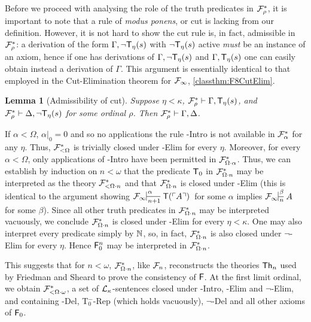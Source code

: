 \documentclass[UKenglish,cleveref,DIV=12]{scrartcl}
\newtheorem{lemma}{Lemma}
\theoremstyle{definition}
\theoremstyle{definition}
\begin{document}
Before we proceed with analysing the role of the truth predicates in
$\mathcal{F}^*_\rho$, it is important to note that a rule of {\em modus ponens}, or cut
is lacking from our definition. However, it is not hard to show the cut rule is,
in fact, admissible in $\mathcal{F}^*_\rho$: a derivation of
the form $\Gamma,\lnot \mathsf{T}_\eta(s)$ with $\lnot\mathsf{T}_\eta(s)$ active {\em must} be an
instance of an axiom, hence if one has derivations of $\Gamma,\lnot \mathsf{T}_\eta(s)$
and $\Gamma,\mathsf{T}_\eta(s)$ one can easily obtain instead a derivation of $\Gamma$.
This argument is essentially identical to that employed in the Cut-Elimination
theorem for $\mathcal{F}_\infty$, \cref{classthm:F8CutElim}.
\begin{lemma}[Admissibility of cut]\label{extthm:FFCutElim}
 Suppose $\eta<\kappa$, $\mathcal{F}^*_\rho\vdash\Gamma,\mathsf{T}_\eta(s)$, and $\mathcal{F}^*_\rho\vdash\Delta,\lnot
  \mathsf{T}_\eta(s)$ for some ordinal $\rho$. Then $\mathcal{F}^*_\rho\vdash\Gamma,\Delta$.
\end{lemma}

If $\alpha<\Omega$, $\alpha|_0=0$ and so no applications the rule \textT\eta-Intro is not available in $\mathcal{F}^*_\alpha$ for any $\eta$. Thus, $\mathcal{F}^*_{\mathord<\Omega}$ is trivially closed under \textT\eta-Elim for every $\eta$. Moreover, for every
$\alpha<\Omega$, only applications of -Intro have been permitted in $\mathcal{F}^*_{\Omega\cdot\alpha}$. Thus, we can
establish by induction on $n<\omega$ that the predicate $\mathsf{T}_0$ in $\mathcal{F}^*_{\Omega\cdot n}$ may be interpreted as the
theory $\mathcal{F}^*_{<\Omega\cdot n}$ and that $\mathcal{F}^*_{\Omega\cdot n}$ is closed under -Elim (this is identical to the argument showing $\Finfty\prov\alpha {n+1}{\T(\gn A)}$ for some $\alpha$ implies $\Finfty\prov\beta n A$ for some $\beta$). Since all other truth
predicates in $\mathcal{F}^*_{\Omega\cdot n}$ may be interpreted vacuously, we conclude $\mathcal{F}^*_{\Omega\cdot n}$ is closed under
\textT\eta-Elim for every $\eta<\kappa$. One may also interpret every predicate simply by $\mathbb N$, so, in fact,
$\mathcal{F}^*_{\Omega\cdot n}$ is also closed under $\lnot$\textT\eta-Elim for every $\eta$. Hence $\mathsf{F}_0^n$ may be interpreted
in $\mathcal{F}^*_{\Omega\cdot n}$.

This suggests that for $n<\omega$, $\mathcal{F}^*_{\Omega\cdot n}$, like $\mathcal{F}_n$, reconstructs
the theories $\mathsf{Th}_n$ used by Friedman and Sheard to prove the consistency of
$\mathsf{F}$. At the first limit ordinal,
we obtain $\mathcal{F}^*_{<\Omega\cdot\omega}$, a set of $\mathcal{L}_\kappa$-sentences closed under
-Intro, -Elim and $\lnot$-Elim, and containing -Del, T$_0^-$-Rep (which holds vacuously), $\lnot$-Del and all other axioms of $\mathsf{F}_0$.
\end{document}
